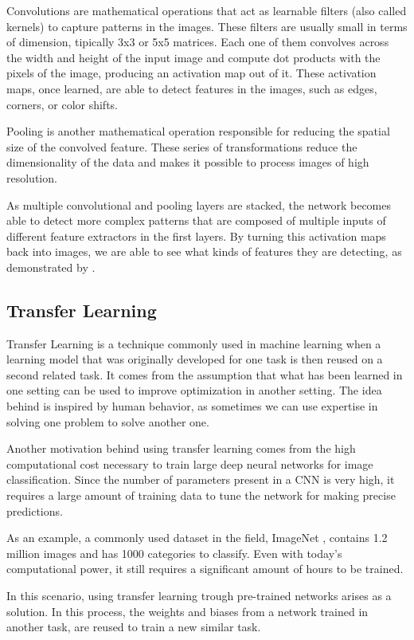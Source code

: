 Convolutions are mathematical operations that act as learnable filters (also called kernels) to capture patterns in the images. These filters are usually small in terms of dimension, tipically 3x3 or 5x5 matrices. Each one of them convolves across the width and height of the input image and compute dot products with the pixels of the image, producing an activation map out of it. These activation maps, once learned, are able to detect features in the images, such as edges, corners, or color shifts. 

Pooling is another mathematical operation responsible for reducing the spatial size of the convolved feature. These series of transformations reduce the dimensionality of the data and makes it possible to process images of high resolution. 

As multiple convolutional and pooling layers are stacked, the network becomes able to detect more complex patterns that are composed of multiple inputs of different feature extractors in the first layers. By turning this activation maps back into images, we are able to see what kinds of features they are detecting, as demonstrated by \citep{ZeilerF14}. 

\subsection{Transfer Learning}

Transfer Learning is a technique commonly used in machine learning when a learning model that was originally developed for one task is then reused on a second related task. It comes from the assumption that what has been learned in one setting can be used to improve optimization in another setting. The idea behind is inspired by human behavior, as sometimes we can use expertise in solving one problem to solve another one.

Another motivation behind using transfer learning comes from the high computational cost necessary to train large deep neural networks for image classification. Since the number of parameters present in a CNN is very high, it requires a large amount of training data to tune the network for making precise predictions.

As an example, a commonly used dataset in the field, ImageNet \citep{DengDSLL009}, contains 1.2 million images and has 1000 categories to classify. Even with today's computational power, it still requires a significant amount of hours to be trained.

In this scenario, using transfer learning trough pre-trained networks arises as a solution. In this process, the weights and biases from a network trained in another task, are reused to train a new similar task.

